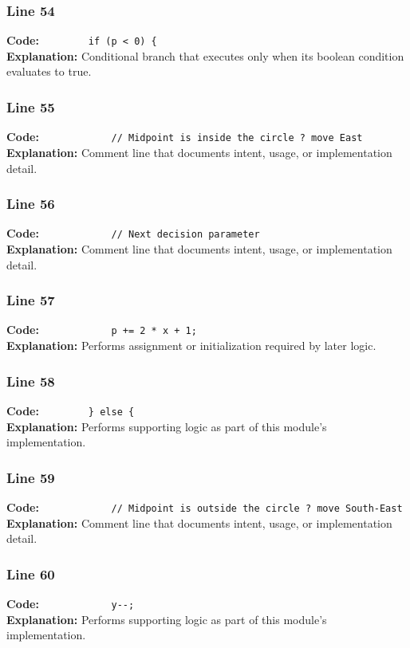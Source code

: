 \documentclass[11pt,a4paper]{article}
\begin{document}
\subsubsection*{Line 54}
\textbf{Code:} \verb|        if (p < 0) {|\\
\textbf{Explanation:} Conditional branch that executes only when its boolean condition evaluates to true.

\subsubsection*{Line 55}
\textbf{Code:} \verb|            // Midpoint is inside the circle ? move East|\\
\textbf{Explanation:} Comment line that documents intent, usage, or implementation detail.

\subsubsection*{Line 56}
\textbf{Code:} \verb|            // Next decision parameter|\\
\textbf{Explanation:} Comment line that documents intent, usage, or implementation detail.

\subsubsection*{Line 57}
\textbf{Code:} \verb|            p += 2 * x + 1;|\\
\textbf{Explanation:} Performs assignment or initialization required by later logic.

\subsubsection*{Line 58}
\textbf{Code:} \verb|        } else {|\\
\textbf{Explanation:} Performs supporting logic as part of this module's implementation.

\subsubsection*{Line 59}
\textbf{Code:} \verb|            // Midpoint is outside the circle ? move South-East|\\
\textbf{Explanation:} Comment line that documents intent, usage, or implementation detail.

\subsubsection*{Line 60}
\textbf{Code:} \verb|            y--;|\\
\textbf{Explanation:} Performs supporting logic as part of this module's implementation.
\end{document}
